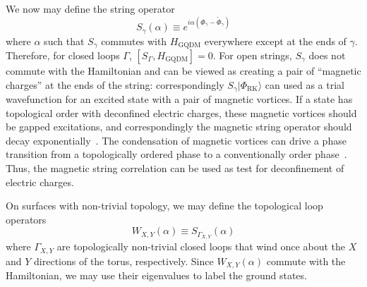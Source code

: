 \documentclass[twocolumn,prb,aps,floatfix,superscriptaddress]{revtex4-1}
\newcommand{\ket}[1]{| #1 \rangle}
\newcommand{\RK}{\mathrm{RK}}
\newcommand{\HGQDM}{H_\mathrm{GQDM}}
\begin{document}
We now may define the string operator
\begin{equation}
S_\gamma \left( \alpha \right) \equiv e^{i \alpha \left( \Phi_\gamma - \tilde{\Phi}_\gamma \right)} \label{eq:Sgamma}
\end{equation}
where $\alpha$ such that $S_\gamma$ commutes with $\HGQDM$ everywhere except at the ends of $\gamma$. Therefore, for closed loops $\Gamma$, $[ S_\Gamma,\HGQDM]=0$. For open strings, $S_\gamma$ does not commute with the Hamiltonian and can be viewed as creating a pair of ``magnetic charges'' at the ends of the string: correspondingly $S_\gamma \ket{\Phi_{\RK}}$ can used as a trial wavefunction for an excited state with a pair of magnetic vortices. If a state has topological order with deconfined electric charges, these magnetic vortices should be gapped excitations, and correspondingly the magnetic string operator should decay exponentially~\cite{Read1989a,Senthil2000,Senthil2001e}. The condensation of magnetic vortices can drive a phase transition from a topologically ordered phase to a conventionally order phase~\cite{Jalabert1991,Ralko2007,Huh2011}. Thus, the magnetic string correlation can be used as test for deconfinement of electric charges.

On surfaces with non-trivial topology, we may define the topological loop operators
\begin{equation}
W_{X,Y} \left( \alpha \right) \equiv S_{\Gamma_{X,Y}} \left( \alpha \right)
\end{equation}
where $\Gamma_{X,Y}$ are topologically non-trivial closed loops that wind once about the $X$ and $Y$ directions of the torus, respectively. Since $W_{X,Y} (\alpha)$ commute with the Hamiltonian, we may use their eigenvalues to label the ground states.
\end{document}
